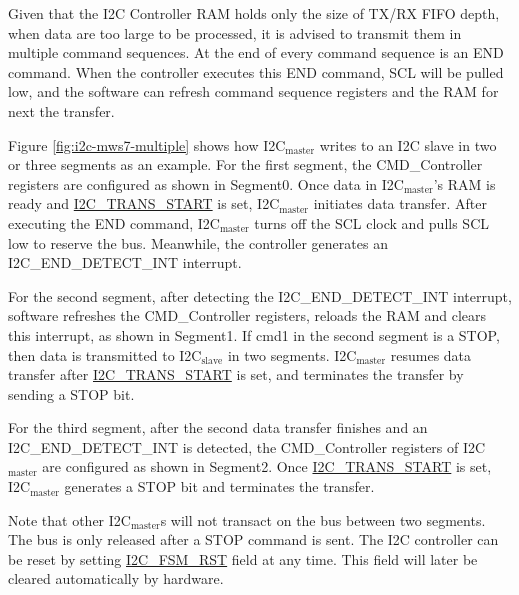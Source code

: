 \documentclass[main\_\_EN.tex]{subfiles}
\begin{document}
Given that the I2C Controller RAM holds only the size of TX/RX FIFO depth, when data are too large to be processed, it is advised to transmit them in multiple command sequences. At the end of every command sequence is an END command. When the controller executes this END command, SCL will be pulled low, and the software can refresh command sequence registers and the RAM for next the transfer.

Figure \ref{fig:i2c-mws7-multiple} shows how I2C$_\text{master}$ writes to an I2C slave in two or three segments as an example. For the first segment, the CMD\_Controller registers are configured as shown in Segment0. Once data in I2C$_\text{master}$’s RAM is ready and \hyperref[fielddesc:I2CTRANSSTART]{I2C\_TRANS\_START} is set, I2C$_\text{master}$ initiates data transfer. After executing the END command, I2C$_\text{master}$ turns off the SCL clock and pulls SCL low to reserve the bus. Meanwhile, the controller generates an I2C\_END\_DETECT\_INT interrupt.

For the second segment, after detecting the I2C\_END\_DETECT\_INT interrupt, software refreshes the CMD\_Controller registers, reloads the RAM and clears this interrupt, as shown in Segment1. If cmd1 in the second segment is a STOP, then data is transmitted to I2C$_\text{slave}$ in two segments. I2C$_\text{master}$ resumes data transfer after \hyperref[fielddesc:I2CTRANSSTART]{I2C\_TRANS\_START} is set, and terminates the transfer by sending a STOP bit.

For the third segment, after the second data transfer finishes and an I2C\_END\_DETECT\_INT is detected, the CMD\_Controller registers of I2C$_\text{master}$ are configured as shown in Segment2. Once \hyperref[fielddesc:I2CTRANSSTART]{I2C\_TRANS\_START} is set, I2C$_\text{master}$ generates a STOP bit and terminates the transfer. 

Note that other I2C$_\text{master}$s will not transact on the bus between two segments. The bus is only released after a STOP command is sent. The I2C controller can be reset by setting \hyperref[fielddesc:I2CFSMRST]{I2C\_FSM\_RST} field at any time. This field will later be cleared automatically by hardware.
\end{document}
